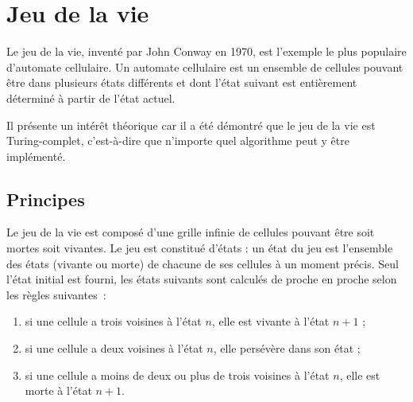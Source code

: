 
\newcommand{\cellcolor}[1]{%
\ifnum\pdfstrcmp{#1}{alive}=0 matblue\fi%
\ifnum\pdfstrcmp{#1}{dying}=0 matred\fi%
\ifnum\pdfstrcmp{#1}{nascent}=0 matgreen\fi}

\newcommand{\fillcell}[3]{
\ifnum\pdfstrcmp{#3}{stillborn}=0
\draw [fill=\cellcolor{dying}] (#1,#2) -- (#1+1,#2) -- (#1+1,#2+1) -- (#1,#2);
\draw [fill=\cellcolor{nascent}] (#1,#2) -- (#1,#2+1) -- (#1+1,#2+1) -- (#1,#2);
\else
\draw [fill=\cellcolor{#3}] (#1,#2) rectangle (#1+1,#2+1);
\fi
}


\chapter{Jeu de la vie}

Le jeu de la vie, inventé par John Conway en 1970, est l'exemple le plus
populaire d'automate cellulaire.
\cite{gof-wikipedia}
Un automate cellulaire est un ensemble
de cellules pouvant être dans plusieurs états différents et dont l'état
suivant est entièrement déterminé à partir de l'état actuel.
\cite{gof-automata}

Il présente un intérêt théorique car il a été démontré que le jeu de la vie
est Turing-complet, c'est-à-dire que n'importe quel algorithme peut
y être implémenté.

\section{Principes}\label{sec:principes}

Le jeu de la vie est composé d'une grille infinie de cellules pouvant
être soit mortes soit vivantes. Le jeu est constitué d'états : un état du jeu
est l'ensemble des états (vivante ou morte) de chacune de ses cellules à
un moment précis. Seul l'état initial est fourni, les états suivants sont calculés
de proche en proche selon les règles suivantes~:

\begin{enumerate}
    \item si une cellule a trois voisines à l'état $n$, elle est vivante à l'état $n+1$ ;
    \item si une cellule a deux voisines à l'état $n$, elle persévère dans son état ;
    \item si une cellule a moins de deux ou plus de trois voisines à l'état $n$, elle est morte à l'état $n+1$.
    \cite{gof-conwaylife}
\end{enumerate}

